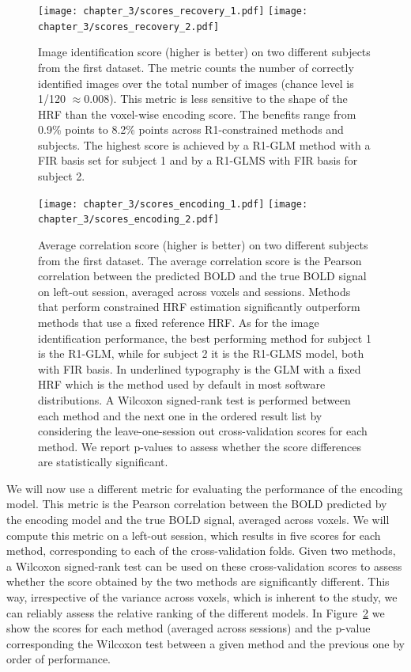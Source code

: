 \begin{figure} \centering
\texttt{[image: chapter\_3/scores\_recovery\_1.pdf]}
\texttt{[image: chapter\_3/scores\_recovery\_2.pdf]}
\caption{\label{fig:identification_scores} Image identification score (higher is better) on two different subjects from the first dataset. The metric counts the number of correctly identified images over the total number of images (chance level is 1/120 $\approx 0.008$). This metric is less sensitive to the shape of the HRF than the voxel-wise encoding score. The benefits range from 0.9\% points to 8.2\% points across R1-constrained methods and subjects. The highest score is achieved by a R1-GLM method with a FIR basis set for subject 1 and by a R1-GLMS with FIR basis for subject 2.
}
\end{figure}


\begin{figure} \centering
\texttt{[image: chapter\_3/scores\_encoding\_1.pdf]}
\texttt{[image: chapter\_3/scores\_encoding\_2.pdf]}
\caption{\label{fig:encoding_scores} Average correlation score (higher is better) on two different subjects from the first dataset. The average correlation score is the Pearson correlation between the predicted BOLD and the true BOLD signal on left-out session, averaged across voxels and sessions. Methods that perform constrained HRF estimation significantly outperform 
methods that use a fixed reference HRF. As for the image identification performance,
the best performing method for subject 1 is the R1-GLM, while for subject 2 it is the R1-GLMS model, both with FIR basis. 
In underlined typography is the GLM with a fixed HRF which is the method
used by default in most software distributions.
A Wilcoxon signed-rank test is performed
between each method and the next one in the ordered result list by considering the leave-one-session out cross-validation scores for each method.
We report p-values to assess whether the score differences
are statistically significant.
}
\end{figure}

We will now use a different metric for evaluating the performance of the encoding model. This metric is the Pearson correlation between the BOLD predicted by the encoding model and the true BOLD signal, averaged across voxels. We will compute this metric on a left-out session, which results in five scores for each method, corresponding to each of the cross-validation folds. Given two methods, a Wilcoxon signed-rank test can be used on these cross-validation scores to assess whether the score obtained by the two methods are significantly different. This way, irrespective of the  variance across voxels, which is inherent to the study, we can reliably  assess the relative ranking of the different models. In Figure~\ref{fig:encoding_scores} we show the scores for each method (averaged across sessions) and the p-value corresponding the Wilcoxon test between a given method and the previous one by order of performance.


